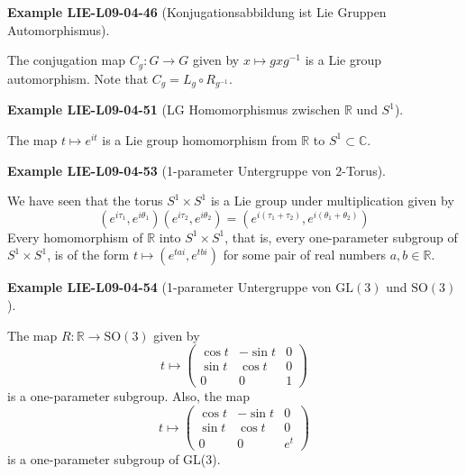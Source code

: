 \documentclass[10pt, letterpaper]{article}
\newcommand{\R}{\mathbb{R}}
\newcommand{\GL}{\mathrm{GL}}
\newcommand{\SO}{\mathrm{SO}}
\newcommand{\CustomHeading}[3]{%
  \par\medskip\noindent%
  \textbf{#1 #2} \textnormal{(#3)}.\enskip%
}
\newenvironment{EXA}[2]{\CustomHeading{Example}{#1}{#2}}{}
\begin{document}
\begin{EXA}{LIE-L09-04-46}{Konjugationsabbildung ist Lie Gruppen Automorphismus}
The conjugation map $C_{g}: G \rightarrow G$ given by $x \mapsto g x g^{-1}$ is a Lie group automorphism. Note that $C_{g}=L_{g} \circ R_{g^{-1}}$.
\end{EXA}

\begin{EXA}{LIE-L09-04-51}{LG Homomorphismus zwischen $\R$ und $S^1$}
The map $t \mapsto e^{i t}$ is a Lie group homomorphism from $\mathbb{R}$ to $S^{1} \subset \mathbb{C}$.
\end{EXA}

\begin{EXA}{LIE-L09-04-53}{1-parameter Untergruppe von $2$-Torus}
We have seen that the torus $S^{1} \times S^{1}$ is a Lie group under multiplication given by 
$$\left(e^{i \tau_{1}}, e^{i \theta_{1}}\right)\left(e^{i \tau_{2}}, e^{i \theta_{2}}\right)=\left(e^{i\left(\tau_{1}+\tau_{2}\right)}, e^{i\left(\theta_{1}+\theta_{2}\right)}\right)$$ 
Every homomorphism of $\mathbb{R}$ into $S^{1} \times S^{1}$, that is, every one-parameter subgroup of $S^{1} \times S^{1}$, is of the form $t \mapsto\left(e^{t a i}, e^{t b i}\right)$ for some pair of real numbers $a, b \in \mathbb{R}$.
\end{EXA}

\begin{EXA}{LIE-L09-04-54}{1-parameter Untergruppe von $\GL(3)$ und $\SO(3)$}
The map $R: \mathbb{R} \rightarrow \mathrm{SO}(3)$ given by
$$
t \mapsto\left(\begin{array}{ccc}
\cos t & -\sin t & 0 \\
\sin t & \cos t & 0 \\
0 & 0 & 1
\end{array}\right)
$$
is a one-parameter subgroup. Also, the map
$$
t \mapsto\left(\begin{array}{ccc}
\cos t & -\sin t & 0 \\
\sin t & \cos t & 0 \\
0 & 0 & e^{t}
\end{array}\right)
$$
is a one-parameter subgroup of GL(3).
\end{EXA}
\end{document}
